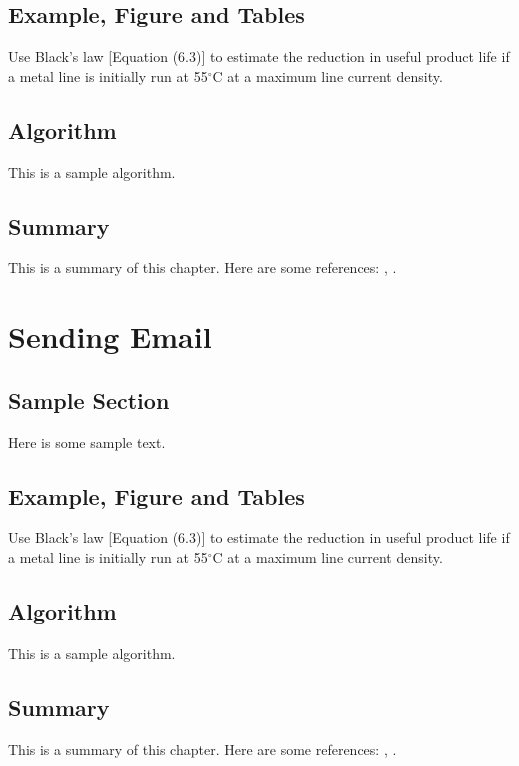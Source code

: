 \documentclass{wileySix}
\begin{document}
\section{Example, Figure and Tables}
\vskip6pt
\begin{example}
	Use Black's law [Equation (6.3)] to estimate the reduction in useful product
	life if a metal line is initially run at 55$^\circ$C at a maximum line
	current density.
\end{example}

\section{Algorithm}
This is a sample algorithm.

\section{Summary}
This is a summary of this chapter.
Here are some references: \cite{xkilby}, \cite{xberen}.

\chapter{Sending Email}

\section{Sample Section}
Here is some sample text.

\section{Example, Figure and Tables}
\vskip6pt
\begin{example}
	Use Black's law [Equation (6.3)] to estimate the reduction in useful product
	life if a metal line is initially run at 55$^\circ$C at a maximum line
	current density.
\end{example}

\section{Algorithm}
This is a sample algorithm.

\section{Summary}
This is a summary of this chapter.
Here are some references: \cite{xkilby}, \cite{xberen}.
\end{document}
